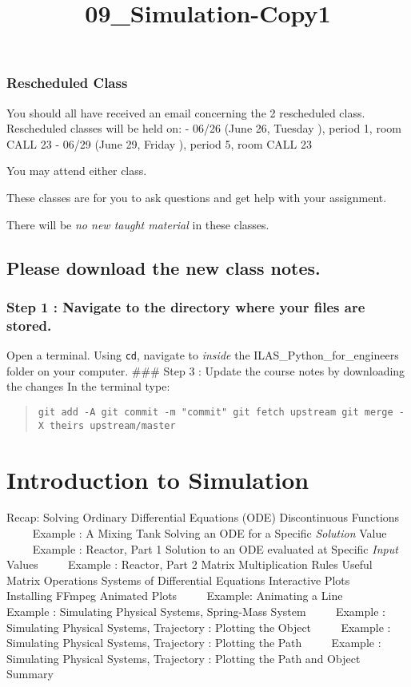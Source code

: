 \documentclass[11pt]{article}
\title{09\_Simulation-Copy1}
\begin{document}
    
    
    \maketitle
    
    

    
    \subsubsection{Rescheduled Class}\label{rescheduled-class}

You should all have received an email concerning the 2 rescheduled
class. Rescheduled classes will be held on: - 06/26 (June 26, Tuesday ),
period 1, room CALL 23 - 06/29 (June 29, Friday ), period 5, room CALL
23

You may attend either class.

These classes are for you to ask questions and get help with your
assignment.

There will be \emph{no new taught material} in these classes.

    \subsection{Please download the new class
notes.}\label{please-download-the-new-class-notes.}

\subsubsection{Step 1 : Navigate to the directory where your files are
stored.}\label{step-1-navigate-to-the-directory-where-your-files-are-stored.}

Open a terminal. Using \texttt{cd}, navigate to \emph{inside} the
ILAS\_Python\_for\_engineers folder on your computer. \#\#\# Step 3 :
Update the course notes by downloading the changes In the terminal type:

\begin{quote}
\texttt{git\ add\ -A\ git\ commit\ -m\ "commit"\ git\ fetch\ upstream\ git\ merge\ -X\ theirs\ upstream/master}
\end{quote}

    \section{Introduction to Simulation}\label{introduction-to-simulation}

 Recap: Solving Ordinary Differential Equations (ODE) Discontinuous
Functions    Example : A Mixing Tank Solving an ODE for a Specific
\emph{Solution} Value    Example : Reactor, Part 1 Solution to an ODE
evaluated at Specific \emph{Input} Values    Example : Reactor, Part 2
Matrix Multiplication Rules Useful Matrix Operations Systems of
Differential Equations Interactive Plots    Installing FFmpeg Animated
Plots    Example: Animating a Line    Example : Simulating Physical
Systems, Spring-Mass System    Example : Simulating Physical Systems,
Trajectory : Plotting the Object    Example : Simulating Physical
Systems, Trajectory : Plotting the Path    Example : Simulating Physical
Systems, Trajectory : Plotting the Path and Object Summary
\end{document}
